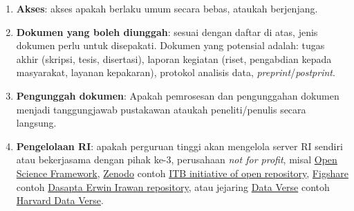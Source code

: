 \documentclass[a4paper]{article}
\begin{document}
\begin{enumerate}

\item \textbf{Akses}: akses apakah berlaku umum secara bebas, ataukah berjenjang.


\item \textbf{Dokumen yang boleh diunggah}: sesuai dengan daftar di atas, jenis dokumen perlu untuk disepakati. Dokumen yang potensial adalah: tugas akhir (skripsi, tesis, disertasi), laporan kegiatan (riset, pengabdian kepada masyarakat, layanan kepakaran), protokol analisis data, \textit{preprint}/\textit{postprint}.  

\item \textbf{Pengunggah dokumen}: Apakah pemrosesan dan pengunggahan dokumen menjadi tanggungjawab pustakawan ataukah peneliti/penulis secara langsung.



\item \textbf{Pengelolaan RI}: apakah perguruan tinggi akan mengelola server RI sendiri atau bekerjasama dengan pihak ke-3, perusahaan \textit{not for profit}, misal \href{osf.io}{Open Science Framework}, \href{zenodo.org}{Zenodo} contoh \href{https://zenodo.org/communities/itbopendatarepo/}{ITB initiative of open repository}, \href{Figshare.com}{Figshare} contoh \href{https://figshare.com/authors/Dasapta_Erwin_Irawan/762036}{Dasapta Erwin Irawan repository}, atau jejaring \href{https://dataverse.org/}{Data Verse} contoh \href{https://dataverse.harvard.edu/}{Harvard Data Verse}. 


\end{enumerate}
\end{document}
